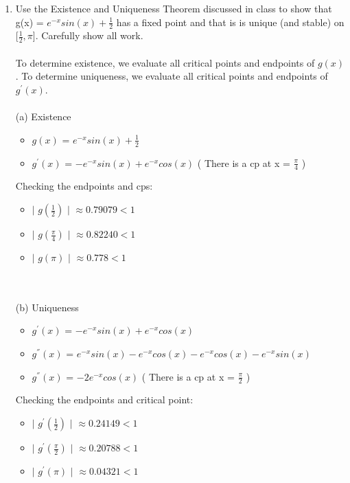 \documentclass[12pt]{article}
\begin{document}
\begin{enumerate}
	\item Use the Existence and Uniqueness Theorem discussed in class to show that g(x) = $e^{-x}sin(x)+\frac{1}{2}$ has a fixed point and that is is unique (and stable) on [$\frac{1}{2}, \pi$]. Carefully show all work. \\ \\
	To determine existence, we evaluate all critical points and endpoints of $g(x)$. To determine uniqueness, we evaluate all critical points and endpoints of $g^{'}(x)$. \\ \\
	(a) Existence
	\begin{itemize}
		\item[] $g(x)$ = $e^{-x}sin(x)+\frac{1}{2}$
		\item[] $g^{'}(x)$ = $-e^{-x}sin(x) + e^{-x}cos(x)$ ( There is a cp at x = $\frac{\pi}{4}$ )
	\end{itemize}
	Checking the endpoints and cps:
	\begin{itemize}
		\item[] $|$ $g(\frac{1}{2})$ $|$ $\approx 0.79079 < 1$
		\item[] $|$ $g(\frac{\pi}{4})$ $|$ $\approx 0.82240 < 1$
		\item[] $|$ $g(\pi)$ $|$ $\approx 0.778 < 1$
	\end{itemize}
	 \\ \\
	(b) Uniqueness
	\begin{itemize}
		\item[] $g^{'}(x)$ = $-e^{-x}sin(x) + e^{-x}cos(x)$
		\item[] $g^{''}(x)$ = $e^{-x}sin(x) - e^{-x}cos(x) - e^{-x}cos(x) - e^{-x}sin(x)$
		\item[] $g^{''}(x)$ = $-2e^{-x}cos(x)$ ( There is a cp at x = $\frac{\pi}{2}$ )	
	\end{itemize}
		Checking the endpoints and critical point:
	\begin{itemize}
		\item[] $|$ $g^{'}(\frac{1}{2})$ $|$ $\approx 0.24149 < 1$
		\item[] $|$ $g^{'}(\frac{\pi}{2})$ $|$ $\approx 0.20788 < 1$
		\item[] $|$ $g^{'}(\pi)$ $|$ $\approx 0.04321 < 1$
	\end{itemize}
	 \\ \\

\end{enumerate}
\end{document}
